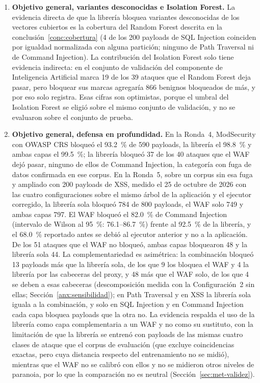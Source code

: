 \begin{enumerate}
    \item \textbf{Objetivo general, variantes desconocidas e Isolation Forest.}\label{conc:variantes}
    La evidencia directa de que la librería bloquea variantes desconocidas de los vectores cubiertos
    es la cobertura del Random Forest descrita en la conclusión~\ref{conc:cobertura} (4 de los 200 payloads de SQL
    Injection coinciden por igualdad normalizada con alguna partición; ninguno de Path Traversal ni
    de Command Injection). La contribución del Isolation Forest solo tiene evidencia indirecta: en
    el conjunto de validación del componente de Inteligencia Artificial \cite{valenzuela2026ia} marca 19 de los 39 ataques
    que el Random Forest deja pasar, pero bloquear sus marcas agregaría 866 benignos bloqueados de
    más, y por eso solo registra. Esas cifras son optimistas, porque el umbral del Isolation Forest
    se eligió sobre el mismo conjunto de validación, y no se evaluaron sobre el conjunto de prueba.

    \item \textbf{Objetivo general, defensa en profundidad.}\label{conc:waf} En la Ronda~4, ModSecurity con OWASP CRS
    bloqueó el 93.2~\% de 590 payloads, la librería el 98.8~\% y ambas capas el 99.5~\%; la librería
    bloqueó 37 de los 40 ataques que el WAF dejó pasar, ninguno de ellos de Command Injection, la
    categoría con fuga de datos confirmada en ese corpus. En la Ronda~5, sobre un corpus sin esa fuga y ampliado
    con 200 payloads de XSS, medido el 25 de octubre de 2026 con las cuatro configuraciones sobre
    el mismo árbol de la aplicación y el ejecutor corregido, la librería sola bloqueó 784 de 800
    payloads, el WAF solo 749 y ambas capas 797. El WAF bloqueó el 82.0~\% de Command Injection
    (intervalo de Wilson al 95~\%: 76.1--86.7~\%) frente al 92.5~\% de la librería, y el 68.0~\%
    reportado antes se debió al ejecutor anterior y no a la aplicación. De los 51 ataques que el WAF
    no bloqueó, ambas capas bloquearon 48 y la librería sola 44. La complementariedad es asimétrica:
    la combinación bloqueó 13 payloads más que la librería sola, de los que 9 los bloquea el WAF y 4
    la librería por las cabeceras del proxy, y 48 más que el WAF solo, de los que 4 se deben a esas
    cabeceras (descomposición medida con la Configuración~2 sin ellas; Sección~\ref{anx:sensibilidad}); en
    Path Traversal y en XSS la librería sola iguala a la combinación, y solo en SQL Injection y en Command Injection cada capa
    bloquea payloads que la otra no. La evidencia respalda el uso de la librería como capa
    complementaria a un WAF y no como su sustituto, con la limitación de que la librería se entrenó
    con payloads de las mismas cuatro clases de ataque que el corpus de evaluación (que excluye
    coincidencias exactas, pero cuya distancia respecto del entrenamiento no se midió), mientras que
    el WAF no se calibró con ellos y no se midieron otros niveles de paranoia, por lo que la
    comparación no es neutral
    (Sección~\ref{sec:met-validez}).


\end{enumerate}
